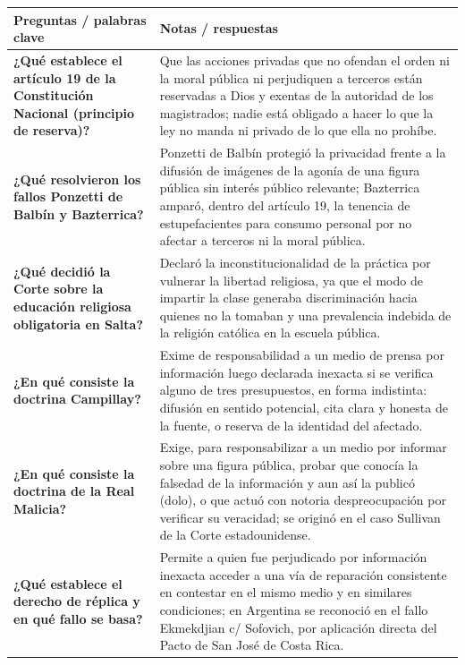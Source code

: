 \documentclass[12pt,oneside]{book}
\begin{document}
\begin{table}[H]
\centering
\begin{tabularx}{\textwidth}{
    >{\raggedright\arraybackslash}p{}
    >{\raggedright\arraybackslash}X
}
\toprule
\textbf{Preguntas / palabras clave} & \textbf{Notas / respuestas} \\
\midrule

\textbf{¿Qué establece el artículo 19 de la Constitución Nacional (principio de reserva)?} &
Que las acciones privadas que no ofendan el orden ni la moral pública ni perjudiquen a terceros están reservadas a Dios y exentas de la autoridad de los magistrados; nadie está obligado a hacer lo que la ley no manda ni privado de lo que ella no prohíbe. \\

\textbf{¿Qué resolvieron los fallos Ponzetti de Balbín y Bazterrica?} &
Ponzetti de Balbín protegió la privacidad frente a la difusión de imágenes de la agonía de una figura pública sin interés público relevante; Bazterrica amparó, dentro del artículo 19, la tenencia de estupefacientes para consumo personal por no afectar a terceros ni la moral pública. \\

\textbf{¿Qué decidió la Corte sobre la educación religiosa obligatoria en Salta?} &
Declaró la inconstitucionalidad de la práctica por vulnerar la libertad religiosa, ya que el modo de impartir la clase generaba discriminación hacia quienes no la tomaban y una prevalencia indebida de la religión católica en la escuela pública. \\

\textbf{¿En qué consiste la doctrina Campillay?} &
Exime de responsabilidad a un medio de prensa por información luego declarada inexacta si se verifica alguno de tres presupuestos, en forma indistinta: difusión en sentido potencial, cita clara y honesta de la fuente, o reserva de la identidad del afectado. \\

\textbf{¿En qué consiste la doctrina de la Real Malicia?} &
Exige, para responsabilizar a un medio por informar sobre una figura pública, probar que conocía la falsedad de la información y aun así la publicó (dolo), o que actuó con notoria despreocupación por verificar su veracidad; se originó en el caso Sullivan de la Corte estadounidense. \\

\textbf{¿Qué establece el derecho de réplica y en qué fallo se basa?} &
Permite a quien fue perjudicado por información inexacta acceder a una vía de reparación consistente en contestar en el mismo medio y en similares condiciones; en Argentina se reconoció en el fallo Ekmekdjian c/ Sofovich, por aplicación directa del Pacto de San José de Costa Rica. \\


\end{tabularx}
\end{table}
\end{document}
